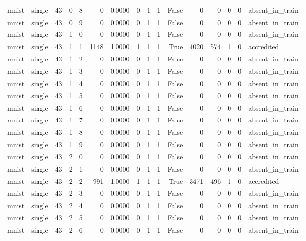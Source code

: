 \begin{tabular}{llrrrrrrrrrrrrrl}
mnist & single & 43 & 0 & 8 & 0 & 0.0000 & 0 & 1 & 1 & False & 0 & 0 & 0 & 0 & absent\_in\_train \\
mnist & single & 43 & 0 & 9 & 0 & 0.0000 & 0 & 1 & 1 & False & 0 & 0 & 0 & 0 & absent\_in\_train \\
mnist & single & 43 & 1 & 0 & 0 & 0.0000 & 0 & 1 & 1 & False & 0 & 0 & 0 & 0 & absent\_in\_train \\
mnist & single & 43 & 1 & 1 & 1148 & 1.0000 & 1 & 1 & 1 & True & 4020 & 574 & 1 & 0 & accredited \\
mnist & single & 43 & 1 & 2 & 0 & 0.0000 & 0 & 1 & 1 & False & 0 & 0 & 0 & 0 & absent\_in\_train \\
mnist & single & 43 & 1 & 3 & 0 & 0.0000 & 0 & 1 & 1 & False & 0 & 0 & 0 & 0 & absent\_in\_train \\
mnist & single & 43 & 1 & 4 & 0 & 0.0000 & 0 & 1 & 1 & False & 0 & 0 & 0 & 0 & absent\_in\_train \\
mnist & single & 43 & 1 & 5 & 0 & 0.0000 & 0 & 1 & 1 & False & 0 & 0 & 0 & 0 & absent\_in\_train \\
mnist & single & 43 & 1 & 6 & 0 & 0.0000 & 0 & 1 & 1 & False & 0 & 0 & 0 & 0 & absent\_in\_train \\
mnist & single & 43 & 1 & 7 & 0 & 0.0000 & 0 & 1 & 1 & False & 0 & 0 & 0 & 0 & absent\_in\_train \\
mnist & single & 43 & 1 & 8 & 0 & 0.0000 & 0 & 1 & 1 & False & 0 & 0 & 0 & 0 & absent\_in\_train \\
mnist & single & 43 & 1 & 9 & 0 & 0.0000 & 0 & 1 & 1 & False & 0 & 0 & 0 & 0 & absent\_in\_train \\
mnist & single & 43 & 2 & 0 & 0 & 0.0000 & 0 & 1 & 1 & False & 0 & 0 & 0 & 0 & absent\_in\_train \\
mnist & single & 43 & 2 & 1 & 0 & 0.0000 & 0 & 1 & 1 & False & 0 & 0 & 0 & 0 & absent\_in\_train \\
mnist & single & 43 & 2 & 2 & 991 & 1.0000 & 1 & 1 & 1 & True & 3471 & 496 & 1 & 0 & accredited \\
mnist & single & 43 & 2 & 3 & 0 & 0.0000 & 0 & 1 & 1 & False & 0 & 0 & 0 & 0 & absent\_in\_train \\
mnist & single & 43 & 2 & 4 & 0 & 0.0000 & 0 & 1 & 1 & False & 0 & 0 & 0 & 0 & absent\_in\_train \\
mnist & single & 43 & 2 & 5 & 0 & 0.0000 & 0 & 1 & 1 & False & 0 & 0 & 0 & 0 & absent\_in\_train \\
mnist & single & 43 & 2 & 6 & 0 & 0.0000 & 0 & 1 & 1 & False & 0 & 0 & 0 & 0 & absent\_in\_train \\

\end{tabular}
